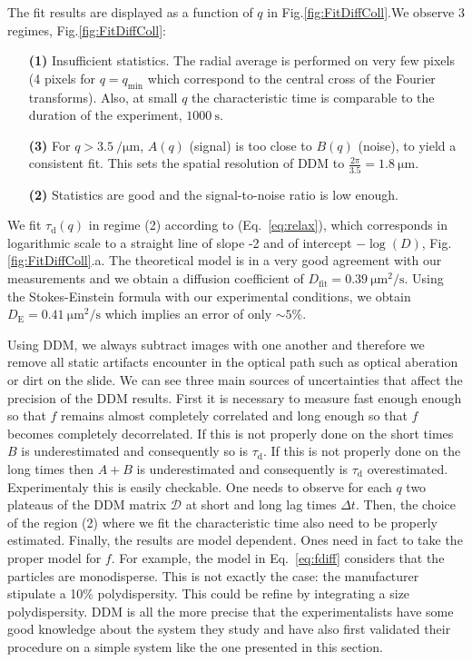 \documentclass[prb,reprint,amsmath,amssymb]{revtex4-1}
\newcommand{\tg}[1]{{\color{magenta}#1}} %
\begin{document}
The fit results are displayed  as a function of $q$ in Fig.\ref{fig:FitDiffColl}.We observe 3 regimes,  Fig.\ref{fig:FitDiffColl}:
\begin{itemize}
\item[\textbf{(1)}] Insufficient statistics. The radial average is performed on very few pixels (4 pixels for $q = q_\text{min}$ which correspond to the central cross of the Fourier transforms).  Also, at small $q$ the characteristic time is comparable to the duration of the experiment, $\SI{1000}{\second}$.
\item[\textbf{(3)}] For  $q>\SI{3.5}{\per\micro\meter}$, $A(q)$ (signal) is too close to $B(q)$ (noise), to yield a consistent fit. This sets the spatial resolution of DDM to  $\frac{2\pi}{3.5} = \SI{1.8}{\micro\meter}$.
\item[\textbf{(2)}] Statistics are good and the signal-to-noise ratio is low enough.
\end{itemize}

We fit $\tau_\text{d}(q)$ in regime (2) according to (Eq.~\ref{eq:relax}), which corresponds in logarithmic scale to a straight line of slope -2 and of intercept $-\log(D)$, Fig.\ref{fig:FitDiffColl}.a. The theoretical model is in a very good agreement with our measurements and we obtain a diffusion coefficient of $D_\text{fit} = \SI{0.39}{\micro\meter\squared\per\second}$. Using the Stokes-Einstein formula with our experimental conditions, we obtain $D_\text{E} = \SI{0.41}{\micro\meter\squared\per\second}$ which implies an error of only $\sim 5 \%$. 

\tg{Using DDM, we always subtract images with one another and therefore we remove all static artifacts encounter in the optical path such as optical aberation or dirt on the slide. We can see three main sources of uncertainties that affect the precision of the DDM results. First it is necessary to measure fast enough enough so that $f$ remains almost completely correlated and long enough so that $f$ becomes completely  decorrelated. If this is not properly done on the short times $B$ is underestimated and consequently so is $\tau_\text{d}$. If this is not properly done on the long times then  $A+B$ is underestimated and consequently is $\tau_\text{d}$ overestimated. Experimentaly this is easily checkable. One needs to observe for each $q$ two plateaus of the DDM matrix $\mathcal{D}$ at short and long lag times $\Delta t$. Then, the choice of the region (2) where we fit the characteristic time also need to be properly estimated. Finally, the results are model dependent. Ones need in fact to take the proper model for $f$. For example, the model in Eq.~\eqref{eq:fdiff}  considers that the particles are monodisperse. This is not exactly the case: the manufacturer stipulate a 10\% polydispersity. This could be refine by integrating a size polydispersity. DDM is all the more precise that the experimentalists have some good knowledge about the system they study and have also first validated their procedure on a simple system like the one presented in this section}.
\end{document}
